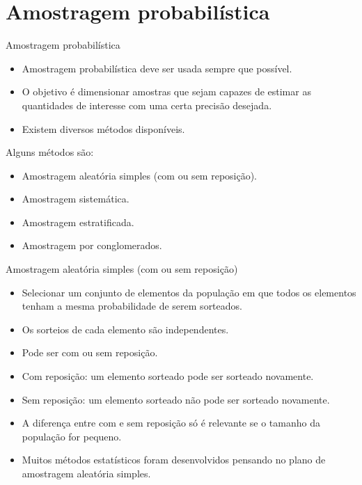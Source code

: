 \documentclass[
  ignorenonframetext,
  serif,
  professionalfont,
  usenames,
  dvipsnames,
  aspectratio = 169]{beamer}
\providecommand{\tightlist}{%
  \setlength{\itemsep}{0pt}\setlength{\parskip}{0pt}}
\renewcommand{\tightlist}{%
  \setlength{\itemsep}{0\baselineskip}
  \setlength{\parskip}{0.25\baselineskip}
}
\begin{document}
\hypertarget{amostragem-probabiluxedstica}{%
\section{Amostragem probabilística}\label{amostragem-probabiluxedstica}}

\begin{frame}{Amostragem probabilística}
\protect\hypertarget{amostragem-probabiluxedstica-1}{}
\begin{itemize}
\item
  Amostragem probabilística deve ser usada sempre que possível.
\item
  O objetivo é dimensionar amostras que sejam capazes de estimar as
  quantidades de interesse com uma certa precisão desejada.
\item
  Existem diversos métodos disponíveis.
\end{itemize}

Alguns métodos são:

\begin{itemize}
\tightlist
\item
  Amostragem aleatória simples (com ou sem reposição).
\item
  Amostragem sistemática.
\item
  Amostragem estratificada.
\item
  Amostragem por conglomerados.
\end{itemize}
\end{frame}

\begin{frame}{Amostragem aleatória simples (com ou sem reposição)}
\protect\hypertarget{amostragem-aleatuxf3ria-simples-com-ou-sem-reposiuxe7uxe3o}{}
\begin{itemize}
\item
  Selecionar um conjunto de elementos da população em que todos os
  elementos tenham a mesma probabilidade de serem sorteados.
\item
  Os sorteios de cada elemento são independentes.
\item
  Pode ser com ou sem reposição.
\item
  Com reposição: um elemento sorteado pode ser sorteado novamente.
\item
  Sem reposição: um elemento sorteado não pode ser sorteado novamente.
\item
  A diferença entre com e sem reposição só é relevante se o tamanho da
  população for pequeno.
\item
  Muitos métodos estatísticos foram desenvolvidos pensando no plano de
  amostragem aleatória simples.
\end{itemize}
\end{frame}
\end{document}
